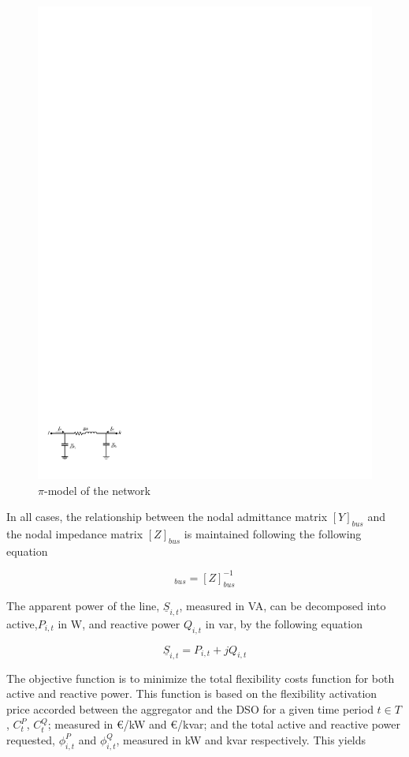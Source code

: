 \begin{figure}[htbp]
	\centering
	\includegraphics[width=0.7\columnwidth ]{ChapterOPF_DSO/Figures/pimodel2.pdf}
		\caption{$\pi$-model of the network}
	\label{fig:pimodel}  
\end{figure}

In all cases, the relationship between the nodal admittance matrix  $[Y]_{bus}$ and the nodal impedance matrix  $[Z]_{bus}$ is maintained following the following equation 

\begin{equation}
[Y]_{bus} = [Z]_{bus}^{-1}
\end{equation}

The apparent power of the line, $\underline{S}_{i,t}$, measured in VA, can be decomposed into active,$P_{i,t}$ in W, and reactive power $Q_{i,t}$ in var, by the following equation 

\begin{equation}
\underline{S}_{i,t} = P_{i,t} + jQ_{i,t}
\end{equation}

The objective function is to minimize the total flexibility costs function for both active and reactive power. This function is based on the flexibility activation price accorded between the aggregator and the DSO for a given time period $t \in T$, $C_t^{P}$, $C_t^{Q}$; measured in \euro/kW and \euro/kvar;  and the total active and reactive power requested, $\phi_{i,t}^{P}$ and $\phi_{i,t}^{Q}$, measured in kW and kvar respectively. This yields

